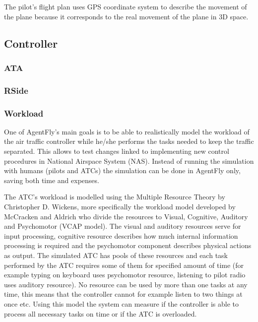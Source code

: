 The pilot's flight plan uses GPS coordinate system to describe the movement of the plane because it corresponds to the real movement of the plane in 3D space.

\subsection{Controller}


\subsubsection{ATA}


\subsubsection{RSide}


\subsubsection{Workload}

One of AgentFly's main goals is to be able to realistically model the workload of the air traffic controller while he/she performs the tasks needed to keep the traffic separated. This allows to test changes linked to implementing new control procedures in National Airspace System (NAS). Instead of running the simulation with humans (pilots and ATCs) the simulation can be done in AgentFly only, saving both time and expenses.

The ATC's workload is modelled using the Multiple Resource Theory by Christopher D. Wickens, more specifically the workload model developed by McCracken and Aldrich who divide the resources to Visual, Cognitive, Auditory and Psychomotor (VCAP model). \cite{agentfly-enroute} The visual and auditory resources serve for input processing, cognitive resource describes how much internal information processing is required and the psychomotor component describes physical actions as output. The simulated ATC has pools of these resources and each task performed by the ATC requires some of them for specified amount of time (for example typing on keyboard uses psychomotor resource, listening to pilot radio uses auditory resource). No resource can be used by more than one tasks at any time, this means that the controller cannot for example listen to two things at once etc. Using this model the system can measure if the controller is able to process all necessary tasks on time or if the ATC is overloaded.

